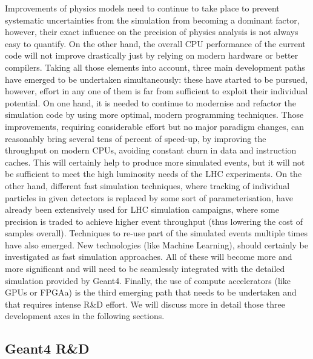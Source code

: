 \documentclass[10pt,a4paper]{article}
\begin{document}
Improvements of physics models need to continue to take place to prevent
systematic uncertainties from the simulation from becoming a dominant
factor, however, their exact influence on the precision of physics
analysis is not always easy to quantify. On the other hand, the overall
CPU performance of the current code will not improve drastically just by
relying on modern hardware or better compilers. Taking all those
elements into account, three main development paths have emerged to be
undertaken simultaneously: these have started to be pursued, however,
effort in any one of them is far from sufficient to exploit their
individual potential. On one hand, it is needed to continue to modernise
and refactor the simulation code by using more optimal, modern
programming techniques. Those improvements, requiring considerable
effort but no major paradigm changes, can reasonably bring several tens
of percent of speed-up, by improving the throughput on modern CPUs,
avoiding constant churn in data and instruction caches. This will
certainly help to produce more simulated events, but it will not be
sufficient to meet the high luminosity needs of the LHC experiments. On
the other hand, different fast simulation techniques, where tracking of
individual particles in given detectors is replaced by some sort of
parameterisation, have already been extensively used for LHC simulation
campaigns, where some precision is traded to achieve higher event
throughput (thus lowering the cost of samples overall). Techniques to
re-use part of the simulated events multiple times have also emerged.
New technologies (like Machine Learning), should certainly be
investigated as fast simulation approaches. All of these will become
more and more significant and will need to be seamlessly integrated with
the detailed simulation provided by Geant4. Finally, the use of compute
accelerators (like GPUs or FPGAa) is the third emerging path that needs
to be undertaken and that requires intense R\&D effort. We will discuss
more in detail those three development axes in the following sections.

\hypertarget{geant4-rd}{%
\subsection{Geant4 R\&D}\label{geant4-rd}}
\end{document}
